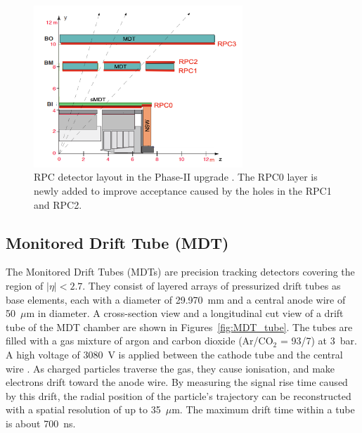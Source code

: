 \begin{figure}[htbp]
  \centering
  \includegraphics[width=0.7\textwidth]{figs/chapter2/RPC_detector_structure.png}
  \caption{RPC detector layout in the Phase-II upgrade \cite{TDAQ_TDR}. The RPC0 layer is newly added to improve acceptance caused by the holes in the RPC1 and RPC2.}
  \label{fig:RPC_structure_upgrade}
\end{figure}

\subsection{Monitored Drift Tube (MDT)}
The Monitored Drift Tubes (MDTs) are precision tracking detectors covering the region of $|\eta| < 2.7$. They consist of layered arrays of pressurized drift tubes as base elements, each with a diameter of 29.970~mm and a central anode wire of 50~$\mu$m in diameter. A cross-section view and a longitudinal cut view of a drift tube of the MDT chamber are shown in Figures~\ref{fig:MDT_tube}. The tubes are filled with a gas mixture of argon and carbon dioxide (Ar/CO$_2$ = 93/7) at 3~bar. A high voltage of 3080~V is applied between the cathode tube and the central wire \cite{ATLASDetector2008}. As charged particles traverse the gas, they cause ionisation, and make electrons drift toward the anode wire. By measuring the signal rise time caused by this drift, the radial position of the particle's trajectory can be reconstructed with a spatial resolution of up to 35~$\mu$m. The maximum drift time within a tube is about 700~ns.

